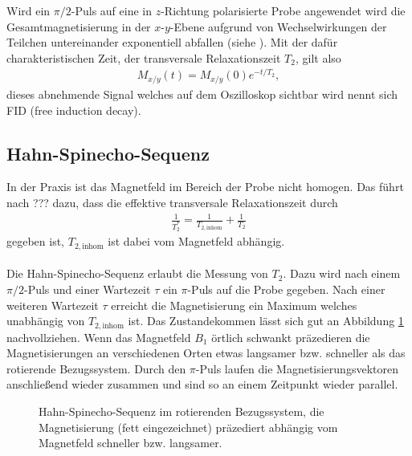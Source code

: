 Wird ein $\pi/2$-Puls auf eine in $z$-Richtung polarisierte Probe angewendet wird die Gesamtmagnetisierung in der $x$-$y$-Ebene aufgrund von Wechselwirkungen der Teilchen untereinander exponentiell abfallen (siehe \cite{manual}). Mit der dafür charakteristischen Zeit, der transversale Relaxationszeit $T_2$, gilt also
\begin{align}
  M_{x/y}(t)=M_{x/y}(0) e^{-t/T_2},
\end{align}
dieses abnehmende Signal welches auf dem Oszilloskop sichtbar wird nennt sich FID (free induction decay).

\subsection{Hahn-Spinecho-Sequenz}
In der Praxis ist das Magnetfeld im Bereich der Probe nicht homogen. Das führt nach ??? dazu, dass die effektive transversale Relaxationszeit durch
\begin{align*}
  \frac{1}{T_2^*}=\frac{1}{T_{2,\mathrm{inhom}}}+\frac{1}{T_2}
\end{align*}
gegeben ist, $T_{2,\mathrm{inhom}}$ ist dabei vom Magnetfeld abhängig. \\ \\
Die Hahn-Spinecho-Sequenz erlaubt die Messung von $T_2$. Dazu wird nach einem $\pi/2$-Puls und einer Wartezeit $\tau$ ein $\pi$-Puls auf die Probe gegeben. Nach einer weiteren Wartezeit $\tau$ erreicht die Magnetisierung ein Maximum welches unabhängig von $T_{2,\mathrm{inhom}}$ ist. Das Zustandekommen lässt sich gut an Abbildung \ref{hahn} nachvollziehen. Wenn das Magnetfeld $B_1$ örtlich schwankt präzedieren die Magnetisierungen an verschiedenen Orten etwas langsamer bzw. schneller als das rotierende Bezugssystem. Durch den $\pi$-Puls laufen die Magnetisierungsvektoren anschließend wieder zusammen und sind so an einem Zeitpunkt wieder parallel. 

\begin{figure}[h]
  \centering
  \caption{Hahn-Spinecho-Sequenz im rotierenden Bezugssystem, die Magnetisierung (fett eingezeichnet) präzediert abhängig vom Magnetfeld schneller bzw. langsamer.}
  \label{hahn}
\end{figure}